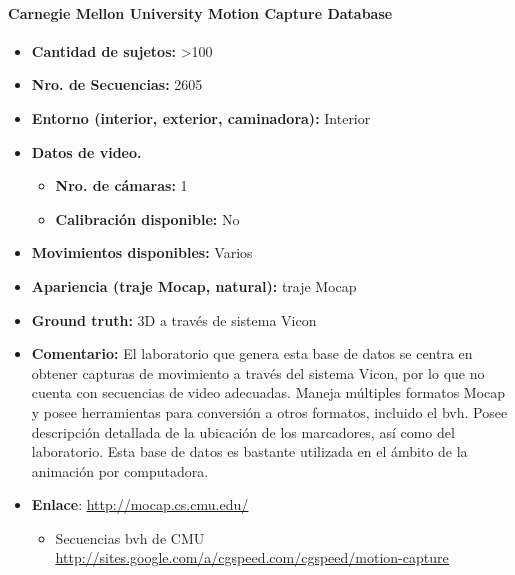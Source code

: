 \paragraph{Carnegie Mellon University Motion Capture Database}
\begin{itemize}
	\item \textbf{Cantidad de sujetos:} >100
	\item \textbf{Nro. de Secuencias:} 2605
	\item \textbf{Entorno (interior, exterior, caminadora):} Interior
	\item \textbf{Datos de video.} 
	\begin{itemize}
		\item \textbf{Nro. de cámaras:} 1
		\item \textbf{Calibración disponible:} No
	\end{itemize}
	\item \textbf{Movimientos disponibles:} Varios
	\item \textbf{Apariencia (traje Mocap, natural):} traje Mocap
	\item \textbf{Ground truth:} 3D a través de sistema Vicon
	\item \textbf{Comentario:} El laboratorio que genera esta base de datos se centra en obtener capturas de movimiento a través del sistema Vicon, por lo que no cuenta con secuencias de video adecuadas. Maneja múltiples formatos Mocap y  posee herramientas para conversión a otros formatos, incluido el bvh. Posee descripción detallada de la ubicación de los marcadores, así como del laboratorio. Esta base de datos es bastante utilizada en el ámbito de la  animación por computadora.
	\item \textbf{Enlace}: \textcolor{blue}{\underline{\url{http://mocap.cs.cmu.edu/}}}
	\begin{itemize}
			\item Secuencias bvh de CMU\\ \textcolor{blue}{\underline{\url{http://sites.google.com/a/cgspeed.com/cgspeed/motion-capture}}}
	\end{itemize}
\end{itemize}
%
